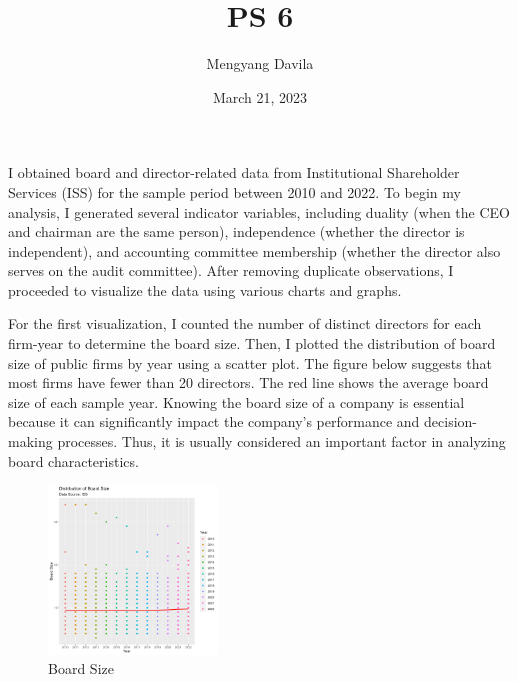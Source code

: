 \documentclass{article}
\title{PS 6}
\author{Mengyang Davila}
\date{March 21, 2023}
\begin{document}
\maketitle
I obtained board and director-related data from Institutional Shareholder Services (ISS) for the sample period between 2010 and 2022. To begin my analysis, I generated several indicator variables, including duality (when the CEO and chairman are the same person), independence (whether the director is independent), and accounting committee membership (whether the director also serves on the audit committee). After removing duplicate observations, I proceeded to visualize the data using various charts and graphs.

For the first visualization, I counted the number of distinct directors for each firm-year to determine the board size. Then, I plotted the distribution of board size of public firms by year using a scatter plot. The figure below suggests that most firms have fewer than 20 directors. The red line shows the average board size of each sample year. Knowing the board size of a company is essential because it can significantly impact the company's performance and decision-making processes. Thus, it is usually considered an important factor in analyzing board characteristics.
\begin{figure}[htbp]
  \centering
  \includegraphics[width=0.4\textwidth]{PS6a_Davila.png}
  \caption{Board Size}
  \label{fig:myimage1}
\end{figure}
\end{document}
